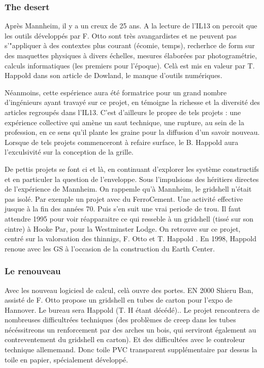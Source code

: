 \subsubsection{The desert}
Après Mannheim, il y a un creux de 25 ans. A la lecture de l'IL13 on percoit que les outils développés par F. Otto sont très avangardistes et ne peuvent pas s'"appliquer à des contextes plus courant (écomie, temps), recherhce de form sur des maquettes physiques à divers échelles, mesures élaborées par photogramétrie, calculs informatiques (les premiers pour l'époque). Celà est mis en valeur par T. Happold dans son article de Dowland, le manque d'outils numériques.

Néanmoins, cette espérience aura été formatrice pour un grand nombre d'ingénieurs ayant travayé sur ce projet, en témoigne la richesse et la diversité des articles regroupés dans l'IL13. C'est d'ailleurs le propre de tels projets : une expérience collective qui amène un saut technique, une rupture, au sein de la profession, en ce sens qu'il plante les graine pour la diffusion d'un savoir nouveau. Lorsque de tels projets commenceront à refaire surface, le B. Happold aura l'exculsivité sur la conception de la grille.

De pettis projets se font ci et là, en continuant d'explorer les système constructifs et en particuler la question de l'enveloppe. Sous l'impulsions des héritiers directes de l'expérience de Mannheim. On rappemle qu'à Mannheim, le gridshell n'était pas isolé. Par exemple un projet avec du FerroCement. Une activité effective jusque à la fin des années 70.
Puis s'en suit une vrai periode de trou. Il faut attendre 1995 pour voir réapparaitre ce qui resseble à un gridshell (tissé sur son cintre) à Hooke Par, pour la Westminster Lodge. On retrouve sur ce projet, centré sur la valorsation des thinnigs,  F. Otto et T. Happold \cite{Burton2010}. En 1998, Happold renoue avec les GS à l'occasion de la construction du Earth Center.

\subsubsection{Le renouveau}
Avec les nouveau logiciesl de calcul, celà ouvre des portes. EN 2000 Shieru Ban, assisté de F. Otto propose un gridshell en tubes de carton pour l'expo de Hannover. Le bureau sera Happold (T. H étant décédé).\cite{Ban2006}. Le projet rencontrera de nombreuses difficultrées techniques (des problèmes de creep dans les tubes nécéssitreons un renforcement par des arches un bois, qui serviront également au contreventement du gridshell en carton). Et des difficultées avec le controleur technique allememand. Donc toile PVC transparent supplémentaire par dessus la toile en papier, spécialement développé.

